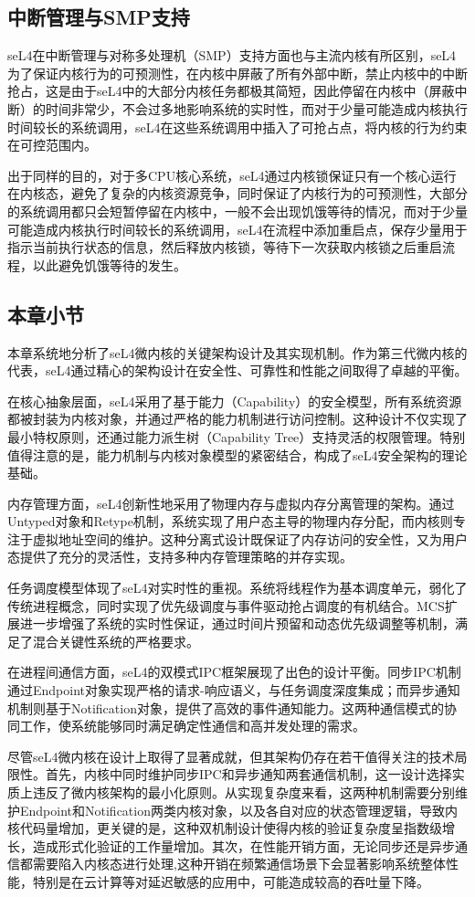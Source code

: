 \subsection{中断管理与SMP支持}
seL4在中断管理与对称多处理机（SMP）支持方面也与主流内核有所区别，seL4为了保证内核行为的可预测性，在内核中屏蔽了所有外部中断，禁止内核中的中断抢占，这是由于seL4中的大部分内核任务都极其简短，因此停留在内核中（屏蔽中断）的时间非常少，不会过多地影响系统的实时性，而对于少量可能造成内核执行时间较长的系统调用，seL4在这些系统调用中插入了可抢占点，将内核的行为约束在可控范围内。

出于同样的目的，对于多CPU核心系统，seL4通过内核锁保证只有一个核心运行在内核态，避免了复杂的内核资源竞争，同时保证了内核行为的可预测性，大部分的系统调用都只会短暂停留在内核中，一般不会出现饥饿等待的情况，而对于少量可能造成内核执行时间较长的系统调用，seL4在流程中添加重启点，保存少量用于指示当前执行状态的信息，然后释放内核锁，等待下一次获取内核锁之后重启流程，以此避免饥饿等待的发生。

\subsection{本章小节}
本章系统地分析了seL4微内核的关键架构设计及其实现机制。作为第三代微内核的代表，seL4通过精心的架构设计在安全性、可靠性和性能之间取得了卓越的平衡。

在核心抽象层面，seL4采用了基于能力（Capability）的安全模型，所有系统资源都被封装为内核对象，并通过严格的能力机制进行访问控制。这种设计不仅实现了最小特权原则，还通过能力派生树（Capability Tree）支持灵活的权限管理。特别值得注意的是，能力机制与内核对象模型的紧密结合，构成了seL4安全架构的理论基础。

内存管理方面，seL4创新性地采用了物理内存与虚拟内存分离管理的架构。通过Untyped对象和Retype机制，系统实现了用户态主导的物理内存分配，而内核则专注于虚拟地址空间的维护。这种分离式设计既保证了内存访问的安全性，又为用户态提供了充分的灵活性，支持多种内存管理策略的并存实现。

任务调度模型体现了seL4对实时性的重视。系统将线程作为基本调度单元，弱化了传统进程概念，同时实现了优先级调度与事件驱动抢占调度的有机结合。MCS扩展进一步增强了系统的实时性保证，通过时间片预留和动态优先级调整等机制，满足了混合关键性系统的严格要求。

在进程间通信方面，seL4的双模式IPC框架展现了出色的设计平衡。同步IPC机制通过Endpoint对象实现严格的请求-响应语义，与任务调度深度集成；而异步通知机制则基于Notification对象，提供了高效的事件通知能力。这两种通信模式的协同工作，使系统能够同时满足确定性通信和高并发处理的需求。

尽管seL4微内核在设计上取得了显著成就，但其架构仍存在若干值得关注的技术局限性。首先，内核中同时维护同步IPC和异步通知两套通信机制，这一设计选择实质上违反了微内核架构的最小化原则。从实现复杂度来看，这两种机制需要分别维护Endpoint和Notification两类内核对象，以及各自对应的状态管理逻辑，导致内核代码量增加，更关键的是，这种双机制设计使得内核的验证复杂度呈指数级增长，造成形式化验证的工作量增加。其次，在性能开销方面，无论同步还是异步通信都需要陷入内核态进行处理,这种开销在频繁通信场景下会显著影响系统整体性能，特别是在云计算等对延迟敏感的应用中，可能造成较高的吞吐量下降。


